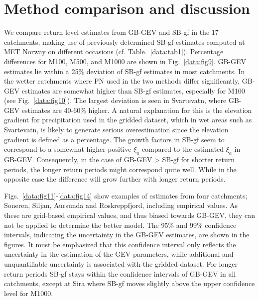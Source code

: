 \documentclass[12pt,a4paper,english]{article}
\begin{document}
\section{Method comparison and discussion}

We compare return level estimates from GB-GEV and SB-gf in the 17 catchments, making use of previously determined SB-gf estimates computed at MET Norway on different occasions (cf. Table.~\ref{data:tab1}). Percentage differences for M100, M500, and M1000 are shown in Fig.~\ref{data:fig9}. GB-GEV estimates lie within a 25\% deviation of SB-gf estimates in most catchments. In the wetter catchments where PN used in the two methods differ significantly, GB-GEV estimates are somewhat higher than SB-gf estimates, especially for M100 (see Fig.~\ref{data:fig10}). The largest deviation is seen in Svartevatn, where GB-GEV estimates are 40-60\% higher. A natural explanation for this is the elevation gradient for precipitation used in the gridded dataset, which in wet areas such as Svartevatn, is likely to generate serious overestimation since the elevation gradient is defined as a percentage. The growth factors in SB-gf seem to correspond to a somewhat higher positive $\xi_{a}$ compared to the estimated $\xi_{a}$ in GB-GEV. Consequently, in the case of GB-GEV > SB-gf for shorter return periods, the longer return periods might correspond quite well. While in the opposite case the difference will grow further with longer return periods. 

Figs.~\ref{data:fig11}-\ref{data:fig14} show examples of estimates from four catchments; Soneren, Siljan, Aursunda and Roskreppfjord, including empirical values. As these are grid-based empirical values, and thus biased towards GB-GEV, they can not be applied to determine the better model. The 95\% and 99\% confidence intervals, indicating the uncertainty in the GB-GEV estimates, are shown in the figures. It must be emphasized that this confidence interval only reflects the uncertainty in the estimation of the GEV parameters, while additional and unquantifiable uncertainty is associated with the gridded dataset. For longer return periods SB-gf stays within the confidence intervals of GB-GEV in all catchments, except at Sira where SB-gf moves slightly above the upper confidence level for M1000. 
\end{document}
